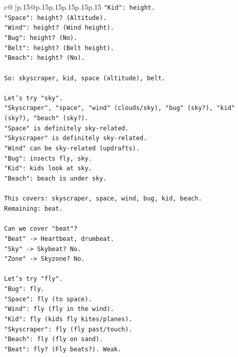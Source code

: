 \documentclass{article}
\begin{document}
{\begin{supertabular}{c@{$\;$}|p{.15\linewidth}@{}p{.15\linewidth}p{.15\linewidth}p{.15\linewidth}p{.15\linewidth}p{.15\linewidth}}
{{{\texttt{"Kid": height.} \\
\texttt{"Space": height? (Altitude).} \\
\texttt{"Wind": height? (Wind height).} \\
\texttt{"Bug": height? (No).} \\
\texttt{"Belt": height? (Belt height).} \\
\texttt{"Beach": height? (No).} \\
\\ 
\texttt{So: skyscraper, kid, space (altitude), belt.} \\
\\ 
\texttt{Let's try "sky".} \\
\texttt{"Skyscraper", "space", "wind" (clouds/sky), "bug" (sky?), "kid" (sky?), "beach" (sky?).} \\
\texttt{"Space" is definitely sky{-}related.} \\
\texttt{"Skyscraper" is definitely sky{-}related.} \\
\texttt{"Wind" can be sky{-}related (updrafts).} \\
\texttt{"Bug": insects fly, sky.} \\
\texttt{"Kid": kids look at sky.} \\
\texttt{"Beach": beach is under sky.} \\
\\ 
\texttt{This covers: skyscraper, space, wind, bug, kid, beach.} \\
\texttt{Remaining: beat.} \\
\\ 
\texttt{Can we cover "beat"?} \\
\texttt{"Beat" {-}> Heartbeat, drumbeat.} \\
\texttt{"Sky" {-}> Skybeat? No.} \\
\texttt{"Zone" {-}> Skyzone? No.} \\
\\ 
\texttt{Let's try "fly".} \\
\texttt{"Bug": fly.} \\
\texttt{"Space": fly (to space).} \\
\texttt{"Wind": fly (fly in the wind).} \\
\texttt{"Kid": fly (kids fly kites/planes).} \\
\texttt{"Skyscraper": fly (fly past/touch).} \\
\texttt{"Beach": fly (fly on sand).} \\
\texttt{"Beat": fly? (Fly beats?). Weak.} \\
}}}
\end{supertabular}}
\end{document}
